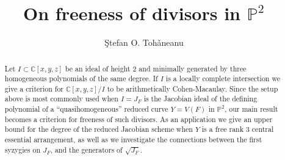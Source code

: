 \documentclass[12pt]{amsart}
\begin{document}
\sloppy
\newtheorem{defn0}{Definition}[section]
\newtheorem{prop0}[defn0]{Proposition}
\newtheorem{conj0}[defn0]{Conjecture}
\newtheorem{thm0}[defn0]{Theorem}
\newtheorem{lem0}[defn0]{Lemma}
\newtheorem{corollary0}[defn0]{Corollary}
\newtheorem{example0}[defn0]{Example}
\newtheorem{remark0}[defn0]{Remark}

\newenvironment{defn}{\begin{defn0}}{\end{defn0}}
\newenvironment{prop}{\begin{prop0}}{\end{prop0}}
\newenvironment{conj}{\begin{conj0}}{\end{conj0}}
\newenvironment{thm}{\begin{thm0}}{\end{thm0}}
\newenvironment{lem}{\begin{lem0}}{\end{lem0}}
\newenvironment{cor}{\begin{corollary0}}{\end{corollary0}}
\newenvironment{exm}{\begin{example0}\rm}{\end{example0}}
\newenvironment{rem}{\begin{remark0}\rm}{\end{remark0}}

\title{On freeness of divisors in $\mathbb P^2$}

\author{\c Stefan O. Toh\v aneanu}
\address{Department of Mathematics\\ The University of Western Ontario\\ London, Ontario N6A 5B7\\}

 

\begin{abstract}
\noindent Let $I\subset \mathbb C[x,y,z]$ be an ideal of height 2 and minimally generated by three homogeneous polynomials of the same degree. If $I$ is a locally complete intersection we give a criterion for $\mathbb C[x,y,z]/I$ to be arithmetically Cohen-Macaulay. Since the setup above is most commonly used when $I=J_F$ is the Jacobian ideal of the defining polynomial of a ``quasihomogeneous'' reduced curve $Y=V(F)$ in $\mathbb P^2$, our main result becomes a criterion for freeness of such divisors. As an application we give an upper bound for the degree of the reduced Jacobian scheme when $Y$ is a free rank 3 central essential arrangement, as well as we investigate the connections between the first syzygies on $J_F$, and the generators of $\sqrt{J_F}$.
\end{abstract}
\maketitle
\end{document}
